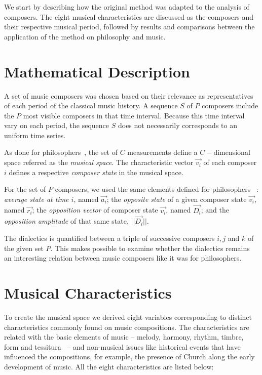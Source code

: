 \documentclass[
 aip,
 jmp,
 amsmath,amssymb,
 reprint,
]{revtex4-1}
\begin{document}
We start by describing how the original method was adapted to the
analysis of composers. The eight musical characteristics are 
discussed as the composers and their respective musical period,
followed by results and comparisons between the application of the
method on philosophy and music.

\section{Mathematical Description}

A set of music composers was chosen based on their
relevance as representatives of each period of the classical music history.
A sequence $S$ of $P$ composers include the $P$ most visible composers
in that time interval. Because this time interval vary on each period,
the sequence $S$ does not necessarily corresponds to an uniform time series.

As done for philosophers~\cite{Fabbri}, the set of $C$ measurements
define a $C-$dimensional space referred as the \emph{musical space}.  
The characteristic vector $\vec{v_i}$ of each composer $i$ defines a respective
\emph{composer state} in the musical space.  

For the set of
$P$ composers, we used the same elements defined for philosophers
~\cite{Fabbri}: \emph{average state at time $i$}, named $\vec{a_i}$;
the \emph{opposite state} of a given composer state $\vec{v_i}$, named $\vec{r_i}$;
the \emph{opposition vector} of composer state $\vec{v_i}$, named
$\vec{D_i}$; and the \emph{opposition
amplitude} of that same state, $|| \vec{D_i} ||$.

The dialectics is quantified between a triple of successive composers
 $i, j$ and $k$ of the given set $P$. This makes possible to examine whether
the dialectics remains an interesting relation between music composers like it was
for philosophers.

\section{Musical Characteristics}

To create the musical space we derived eight variables corresponding to
distinct characteristics commonly found on music compositions. The
characteristics are related with the basic elements of music -- melody,
harmony, rhythm, timbre, form and tessitura~\cite{BennettHistory} -- and
non-musical issues like historical events that have influenced the
compositions, for example, the
presence of Church along the early development of music. All the eight
characteristics are listed below:
\end{document}
